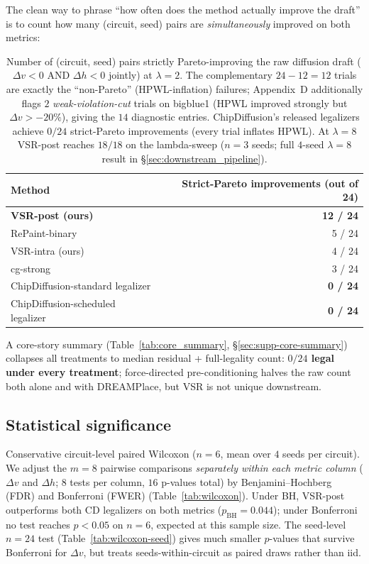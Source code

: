 \documentclass{article}
\begin{document}
The clean way to phrase ``how often does the method actually improve the
draft'' is to count how many (circuit, seed) pairs are
\emph{simultaneously} improved on both metrics:
\begin{table}[h]
\centering
\small
\begin{tabular}{lr}
\toprule
Method & Strict-Pareto improvements (out of 24) \\
\midrule
\textbf{VSR-post (ours)} & \textbf{12 / 24} \\
RePaint-binary & 5 / 24 \\
VSR-intra (ours) & 4 / 24 \\
cg-strong & 3 / 24 \\
ChipDiffusion-standard legalizer & \textbf{0 / 24} \\
ChipDiffusion-scheduled legalizer & \textbf{0 / 24} \\
\bottomrule
\end{tabular}
\caption{Number of (circuit, seed) pairs strictly Pareto-improving the
raw diffusion draft (\,$\Delta v<0$ AND $\Delta h<0$ jointly) at
$\lambda=2$.  The complementary $24-12=12$ trials are exactly the
``non-Pareto'' (HPWL-inflation) failures; Appendix~D additionally
flags $2$ \emph{weak-violation-cut} trials on bigblue1 (HPWL improved
strongly but $\Delta v > -20\%$), giving the $14$ diagnostic entries.
ChipDiffusion's released legalizers achieve $0/24$ strict-Pareto
improvements (every trial inflates HPWL).  At $\lambda=8$ VSR-post
reaches $18/18$ on the lambda-sweep ($n=3$ seeds; full $4$-seed
$\lambda{=}8$ result in \S\ref{sec:downstream_pipeline}).}
\label{tab:strict_pareto}
\end{table}

A core-story summary
(Table~\ref{tab:core_summary}, \S\ref{sec:supp-core-summary})
collapses all treatments to median residual + full-legality count:
\textbf{$0/24$ legal under every treatment}; force-directed
pre-conditioning halves the raw count both alone and with DREAMPlace,
but VSR is not unique downstream.

\subsection{Statistical significance}

Conservative circuit-level paired Wilcoxon ($n{=}6$, mean over $4$
seeds per circuit).  We adjust the $m{=}8$ pairwise comparisons
\emph{separately within each metric column} ($\Delta v$ and $\Delta h$;
$8$ tests per column, $16$ p-values total) by Benjamini--Hochberg
(FDR) and Bonferroni (FWER) (Table~\ref{tab:wilcoxon}).  Under BH,
VSR-post outperforms both CD legalizers on both metrics
($p_\text{BH}{=}0.044$); under Bonferroni no test reaches $p{<}0.05$
on $n{=}6$, expected at this sample size.
The seed-level $n{=}24$ test (Table~\ref{tab:wilcoxon-seed}) gives
much smaller $p$-values that survive Bonferroni for $\Delta v$, but
treats seeds-within-circuit as paired draws rather than iid.
\end{document}
